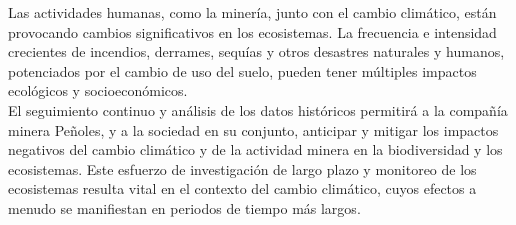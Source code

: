 Las actividades humanas, como la minería, junto con el cambio climático, están provocando cambios significativos en los ecosistemas. La frecuencia e intensidad crecientes de incendios, derrames, sequías y otros desastres naturales y humanos, potenciados por el cambio de uso del suelo, pueden tener múltiples impactos ecológicos y socioeconómicos.\\

El seguimiento continuo y análisis de los datos históricos permitirá a la compañía minera Peñoles, y a la sociedad en su conjunto, anticipar y mitigar los impactos negativos del cambio climático y de la actividad minera en la biodiversidad y los ecosistemas. Este esfuerzo de investigación de largo plazo y monitoreo de los ecosistemas resulta vital en el contexto del cambio climático, cuyos efectos a menudo se manifiestan en periodos de tiempo más largos.\\



